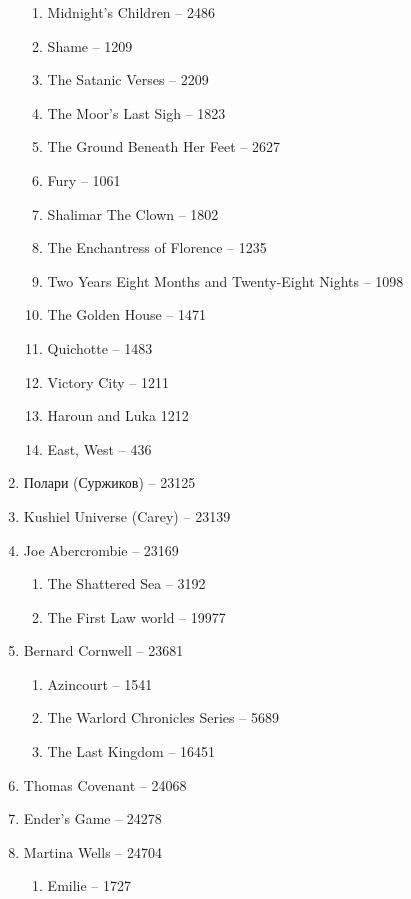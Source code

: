 \documentclass[a4paper, 11pt]{proc} %
\begin{document}
\begin{enumerate}
\begin{enumerate}
            \item Midnight's Children -- 2486
            \item Shame -- 1209
            \item The Satanic Verses -- 2209
            \item The Moor's Last Sigh -- 1823
            \item The Ground Beneath Her Feet -- 2627
            \item Fury -- 1061
            \item Shalimar The Clown -- 1802
            \item The Enchantress of Florence -- 1235
            \item Two Years Eight Months and Twenty-Eight Nights -- 1098
            \item The Golden House -- 1471
            \item Quichotte -- 1483
            \item Victory City -- 1211
            \item Haroun and Luka 1212
            \item East, West -- 436
        \end{enumerate}
    \item Полари (Суржиков) -- 23125
    \item Kushiel Universe (Carey) -- 23139
    \item Joe Abercrombie -- 23169
        \begin{enumerate}
            \item The Shattered Sea -- 3192
            \item The First Law world -- 19977
        \end{enumerate}
    \item Bernard Cornwell -- 23681
        \begin{enumerate}
            \item Azincourt -- 1541
            \item The Warlord Chronicles Series -- 5689
            \item The Last Kingdom -- 16451
        \end{enumerate}
    \item Thomas Covenant -- 24068
    \item Ender's Game -- 24278
    \item Martina Wells -- 24704
        \begin{enumerate}
            \item Emilie -- 1727

\end{enumerate}
\end{enumerate}
\end{document}
